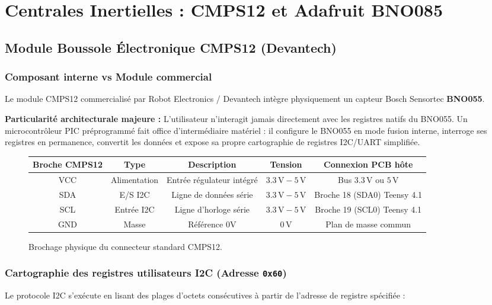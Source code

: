 \documentclass[../Materiel.tex]{subfiles}
\begin{document}
\section{Centrales Inertielles : CMPS12 et Adafruit BNO085}

\subsection{Module Boussole Électronique CMPS12 (Devantech)}

\subsubsection{Composant interne vs Module commercial}
Le module CMPS12 commercialisé par Robot Electronics / Devantech intègre physiquement un capteur Bosch Sensortec \textbf{BNO055}. 

\textbf{Particularité architecturale majeure :} L'utilisateur n'interagit jamais directement avec les registres natifs du BNO055. Un microcontrôleur PIC préprogrammé fait office d'intermédiaire matériel : il configure le BNO055 en mode fusion interne, interroge ses registres en permanence, convertit les données et expose sa propre cartographie de registres I2C/UART simplifiée.

\begin{figure}[htbp]
\centering
\small
\begin{tabular}{|c|c|c|c|c|}
\hline
\textbf{Broche CMPS12} & \textbf{Type} & \textbf{Description} & \textbf{Tension} & \textbf{Connexion PCB hôte} \\
\hline
VCC & Alimentation & Entrée régulateur intégré & $3.3\,\text{V} - 5\,\text{V}$ & Bus $3.3\,\text{V}$ ou $5\,\text{V}$ \\
SDA & E/S I2C & Ligne de données série & $3.3\,\text{V} - 5\,\text{V}$ & Broche 18 (SDA0) Teensy 4.1 \\
SCL & Entrée I2C & Ligne d'horloge série & $3.3\,\text{V} - 5\,\text{V}$ & Broche 19 (SCL0) Teensy 4.1 \\
GND & Masse & Référence 0V & $0\,\text{V}$ & Plan de masse commun \\
\hline
\end{tabular}
\caption{Brochage physique du connecteur standard CMPS12.}
\end{figure}

\subsubsection{Cartographie des registres utilisateurs I2C (Adresse \texttt{0x60})}
Le protocole I2C s'exécute en lisant des plages d'octets consécutives à partir de l'adresse de registre spécifiée :
\end{document}

